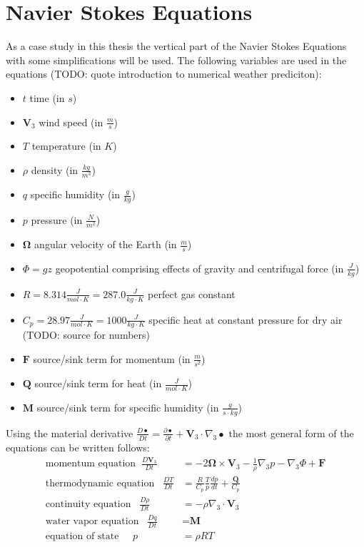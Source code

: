 \chapter{Navier Stokes Equations}\label{chapter:navier_stokes}
As a case study in this thesis the vertical part of the Navier Stokes Equations with some simplifications will be used.
The following variables are used in the equations (TODO: quote introduction to numerical weather prediciton):
\begin{itemize}
\item $t$ time (in $s$)
\item $\textbf{V}_3$ wind speed (in $\frac{m}{s}$)
\item $T$ temperature (in $K$)
\item $\rho$ density (in $\frac{kg}{m^3}$)
\item $q$ specific humidity (in $\frac{g}{kg}$)
\item $p$ pressure (in $\frac{N}{m^2}$)
\item $\boldsymbol{\Omega}$ angular velocity of the Earth (in $\frac{m}{s}$)
\item $\Phi = gz$ geopotential comprising effects of gravity and centrifugal force (in $\frac{J}{kg}$)
\item $R=8.314\frac{J}{mol\cdot K} = 287.0 \frac{J}{kg\cdot K}$ perfect gas constant
\item $C_p=28.97 \frac{J}{mol\cdot K} = 1000 \frac{J}{kg\cdot K}$ specific heat at constant pressure for dry air (TODO: source for numbers)
\item $\textbf{F}$ source/sink term for momentum (in $\frac{m}{s^2}$)
\item $\textbf{Q}$ source/sink term for heat (in $\frac{J}{mol\cdot K}$)
\item $\textbf{M}$ source/sink term for specific humidity (in $\frac{g}{s\cdot kg}$)
\end{itemize}
Using the material derivative $\frac{D\bullet}{Dt}=\frac{\partial\bullet}{\partial t}+\textbf{V}_3\cdot \nabla_3\bullet$ the most general form of the equations can be written follows:
\begin{align}
\text{momentum equation}\;\; \frac{D\textbf{V}_3}{Dt} &= -2\boldsymbol{\Omega}\times \textbf{V}_3 - \frac{1}{\rho}\nabla _3 p - \nabla _3 \Phi + \textbf{F} \label{eq_mom}\\
\text{thermodynamic equation}\;\;\; \frac{DT}{Dt} &= \frac{R}{C_p}\frac{T}{p}\frac{dp}{dt}+\frac{\textbf{Q}}{C_p}\label{eq_therm}\\
\text{continuity equation}\;\;\; \frac{D\rho}{Dt} &= -\rho \nabla _3 \cdot \textbf{V}_3\label{eq_cont}\\
\text{water vapor equation}\;\;\; \frac{Dq}{Dt} &= \textbf{M}\label{eq_water}\\
\text{equation of state}\;\;\;\;\; p &= \rho R T
\end{align}
